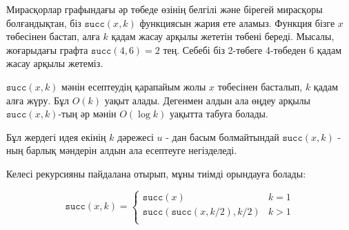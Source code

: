 Мирасқорлар графындағы әр төбеде өзінің белгілі және бірегей
мирасқоры болғандықтан, біз $\texttt{succ}(x,k)$ функциясын
жария ете аламыз. Функция бізге $x$ төбесінен бастап, алға $k$ қадам жасау арқылы жететін төбені береді.
Мысалы, жоғарыдағы графта $\texttt{succ}(4,6)=2$ тең.
Себебі біз 2-төбеге 4-төбеден 6 қадам жасау арқылы жетеміз.

\begin{center}
\end{center}

$\texttt{succ}(x,k)$ мәнін есептеудің қарапайым жолы
$x$ төбесінен басталып, $k$ қадам алға жүру. Бұл $O(k)$ уақыт алады.
Дегенмен алдын ала өңдеу арқылы $\texttt{succ}(x,k)$-тың әр мәнін
$O(\log k)$ уақытта табуға болады.


Бұл жердегі идея екінің $k$ дәрежесі $u$ - дан басым болмайтындай $\texttt{succ}(x,k)$ - ның барлық мәндерін алдын ала есептеуге негізделеді. 

Келесі рекурсияны 
пайдалана отырып, мұны тиімді орындауға болады:

\begin{equation*}
    \texttt{succ}(x,k) = \begin{cases}
               \texttt{succ}(x)              & k = 1\\
               \texttt{succ}(\texttt{succ}(x,k/2),k/2)   & k > 1\\
           \end{cases}
\end{equation*}

